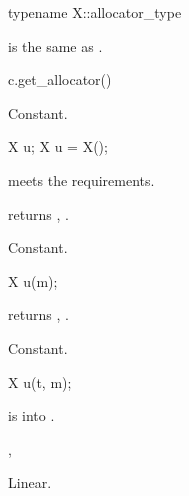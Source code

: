 %
\begin{itemdecl}
typename X::allocator_type
\end{itemdecl}

\begin{itemdescr}
\pnum
\result
{}

\pnum
\expects
{} is the same as .
\end{itemdescr}

%
\begin{itemdecl}
c.get_allocator()
\end{itemdecl}

\begin{itemdescr}
\pnum
\result
{}

\pnum
\complexity
Constant.
\end{itemdescr}

\begin{itemdecl}
X u;
X u = X();
\end{itemdecl}

\begin{itemdescr}
\pnum
\expects
{} meets the  requirements.

\pnum
\ensures
{} returns , .

\pnum
\complexity
Constant.
\end{itemdescr}

\begin{itemdecl}
X u(m);
\end{itemdecl}

\begin{itemdescr}
\pnum
\ensures
{} returns , .

\pnum
\complexity
Constant.
\end{itemdescr}

\begin{itemdecl}
X u(t, m);
\end{itemdecl}

\begin{itemdescr}
\pnum
\expects
{} is  into .

\pnum
\ensures
{}, 

\pnum
\complexity
Linear.
\end{itemdescr}

